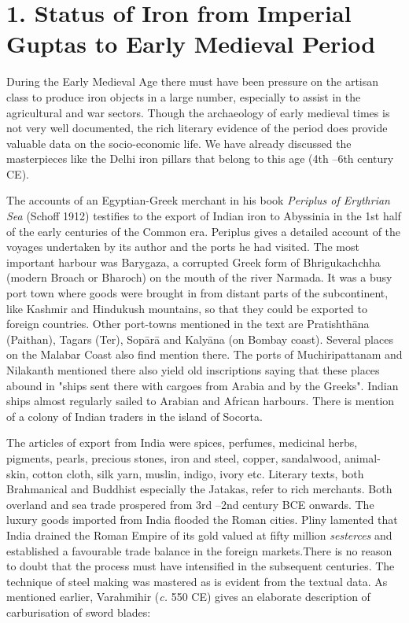 \section*{1. Status of Iron from Imperial Guptas to Early Medieval Period}

During the Early Medieval Age there must have been pressure on the artisan class to produce iron objects in a large number, especially to assist in the agricultural and war sectors. Though the archaeology of early medieval times is not very well documented, the rich literary evidence of the period does provide valuable data on the socio-economic life. We have already discussed the masterpieces like the Delhi iron pillars that belong to this age (4th –6th century CE).

The accounts of an Egyptian-Greek merchant in his book \textit{Periplus of Erythrian Sea} (Schoff 1912) testifies to the export of Indian iron to Abyssinia in the 1st half of the early centuries of the Common era. Periplus gives a detailed account of the voyages undertaken by its author and the ports he had visited. The most important harbour was Barygaza, a corrupted Greek form of Bhrigukachchha (modern Broach or Bharoch) on the mouth of the river Narmada. It was a busy port town where goods were brought in from distant parts of the subcontinent, like Kashmir and Hindukush mountains, so that they could be exported to foreign countries. Other port-towns mentioned in the text are Pratishthāna (Paithan), Tagars (Ter), Sopārā and Kalyāna (on Bombay coast). Several places on the Malabar Coast also find mention there. The ports of Muchiripattanam and Nilakanth mentioned there also yield old inscriptions saying that these places abound in "ships sent there with cargoes from Arabia and by the Greeks". Indian ships almost regularly sailed to Arabian and African harbours. There is mention of a colony of Indian traders in the island of Socorta.

The articles of export from India were spices, perfumes, medicinal herbs, pigments, pearls, precious stones, iron and steel, copper, sandalwood, animal-skin, cotton cloth, silk yarn, muslin, indigo, ivory etc. Literary texts, both Brahmanical and Buddhist especially the Jatakas, refer to rich merchants. Both overland and sea trade prospered from 3rd –2nd century BCE onwards. The luxury goods imported from India flooded the Roman cities. Pliny lamented that India drained the Roman Empire of its gold valued at fifty million \textit{sesterces} and established a favourable trade balance in the foreign markets.There is no reason to doubt that the process must have intensified in the subsequent centuries. The technique of steel making was mastered as is evident from the textual data. As mentioned earlier, Varahmihir (\textit{c.} 550 CE) gives an elaborate description of carburisation of sword blades:

